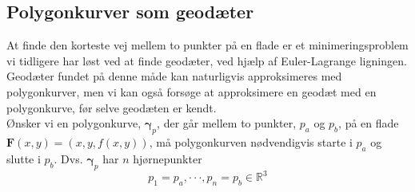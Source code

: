 \subsection{Polygonkurver som geodæter}
At finde den korteste vej mellem to punkter på en flade er et minimeringsproblem vi tidligere har løst ved at finde geodæter, ved hjælp af Euler-Lagrange ligningen. Geodæter fundet på denne måde kan naturligvis approksimeres med polygonkurver, men vi kan også forsøge at approksimere en geodæt med en polygonkurve, før selve geodæten er kendt. \\
Ønsker vi en polygonkurve, \(\pmb{\gamma}_p\), der går mellem to punkter, \(p_a\) og \(p_b\), på en flade \(\pmb{F}(x,y)=(x,y,f(x,y))\), må polygonkurven nødvendigvis starte i \(p_a\) og slutte i \(p_b\). Dvs. \(\pmb{\gamma}_p\) har \(n\) hjørnepunkter 
\begin{equation}
p_1=p_a, \cdot\cdot\cdot, p_n=p_b \in \mathbb{R}^3
\end{equation}

